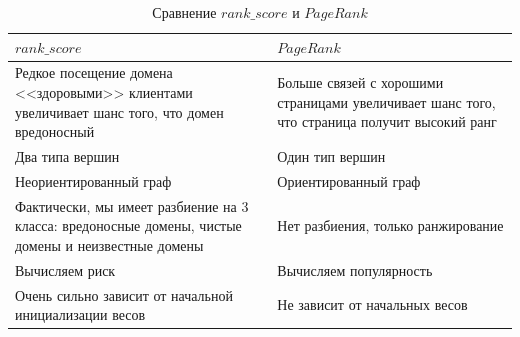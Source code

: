 \documentclass[a4paper,14pt]{extreport} %
\begin{document}
\begin{table}[H]
	\centering
	\caption{Сравнение $rank\_score$ и $PageRank$}\label{tab:pr}
	\begin{tabular}{|p{7cm}|p{7cm}|}
		
		\hline
		$rank\_score$                                                                                                                                                                       & $PageRank$                                                                                                                                                                  \\ \hline
		Редкое посещение домена <<здоровыми>> клиентами увеличивает шанс того, что домен вредоносный           & Больше связей с хорошими страницами увеличивает шанс того, что страница получит высокий ранг \\ \hline 
		Два типа вершин                                                                                                                                                        & Один тип вершин                                                                                                                                                \\ \hline
		Неориентированный граф                                                                                                                                         & Ориентированный граф                                                                                                                                     \\ \hline
		Фактически, мы имеет разбиение на 3 класса: вредоносные домены, чистые домены и неизвестные домены & Нет разбиения, только ранжирование                                                                                                            \\ \hline
		Вычисляем риск                                                                                                                                                         & Вычисляем популярность                                                                                                                                 \\ \hline
		Очень сильно зависит от начальной инициализации весов                                                                                & Не зависит от начальных весов                                                                                                                      \\ \hline
	\end{tabular}
	\\ 
\end{table}
\end{document}
